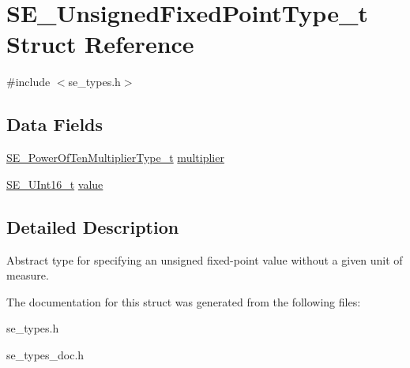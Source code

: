 \hypertarget{structSE__UnsignedFixedPointType__t}{}\section{S\+E\+\_\+\+Unsigned\+Fixed\+Point\+Type\+\_\+t Struct Reference}
\label{structSE__UnsignedFixedPointType__t}


{\ttfamily \#include $<$se\+\_\+types.\+h$>$}

\subsection*{Data Fields}
\begin{DoxyCompactItemize}
\item 
\hyperlink{group__PowerOfTenMultiplierType_gaf0317b781dc8dbb9cb6ac4e44a14fdef}{S\+E\+\_\+\+Power\+Of\+Ten\+Multiplier\+Type\+\_\+t} \hyperlink{group__UnsignedFixedPointType_ga944fd386e2f8f539834109e13291e1c6}{multiplier}
\item 
\hyperlink{group__UInt16_gac68d541f189538bfd30cfaa712d20d29}{S\+E\+\_\+\+U\+Int16\+\_\+t} \hyperlink{group__UnsignedFixedPointType_ga47b5a512b23a9b27559acfa77b0f2881}{value}
\end{DoxyCompactItemize}


\subsection{Detailed Description}
Abstract type for specifying an unsigned fixed-\/point value without a given unit of measure. 

The documentation for this struct was generated from the following files\+:\begin{DoxyCompactItemize}
\item 
se\+\_\+types.\+h\item 
se\+\_\+types\+\_\+doc.\+h\end{DoxyCompactItemize}
